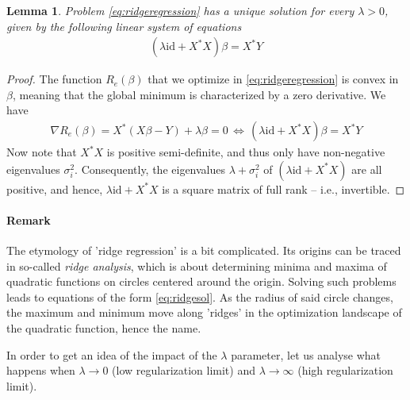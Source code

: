 \documentclass{article}
\newcommand{\id}{\mathrm{id}}
\newtheorem{lemma}{Lemma}
\begin{document}
\begin{lemma}
    Problem \ref{eq:ridgeregression} has a unique solution for every $\lambda>0$, given by the following linear system of equations
    \begin{align}
        (\lambda \id + X^*X)\beta = X^*Y \label{eq:ridgesol}
    \end{align}
\end{lemma}
\begin{proof} The function $R_e(\beta)$ that we optimize in \eqref{eq:ridgeregression} is convex in $\beta$, meaning that the global minimum is characterized by a zero derivative. We have
\begin{align*}
    \nabla R_e(\beta) = X^*(X\beta-Y) + \lambda \beta = 0 \, \Leftrightarrow \, (\lambda \id + X^*X)\beta = X^*Y
\end{align*}
Now note that $X^*X$ is positive semi-definite, and thus only have non-negative eigenvalues $\sigma_i^2$. Consequently, the eigenvalues $\lambda + \sigma_i^2$ of $(\lambda\id + X^*X)$ are all positive, and hence, $\lambda \id + X^*X$ is a square matrix of full rank -- i.e., invertible.
\end{proof}

\paragraph{Remark} The etymology of 'ridge regression' is a bit complicated. Its origins can be traced in so-called \emph{ridge analysis}, which  is about determining minima and maxima of quadratic functions on circles centered around the origin. Solving such problems leads to equations of the form \eqref{eq:ridgesol}. As the radius of said circle changes, the maximum and minimum move along 'ridges' in the optimization landscape of the quadratic function, hence the name. \cite{hoerl2020ridge}

In order to get an idea of the impact of the $\lambda$ parameter, let us analyse what happens when $\lambda\to 0$ (low regularization limit) and $\lambda \to \infty$ (high regularization limit).
\end{document}
